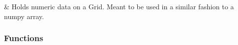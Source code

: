 \documentclass[letterpaper,10pt,english]{sphinxmanual}
\begin{document}
\begin{savenotes}\sphinxatlongtablestart\begin{longtable}[c]{}
\hline

\endfirsthead

%
{}\\
\hline

\endhead

\hline
{}\\
\endfoot

\endlastfoot

\sphinxAtStartPar
{\hyperref[\detokenize{autoapi/Field/index:Field.Field}]{}}
&
\sphinxAtStartPar
Holds numeric data on a Grid. Meant to be used in a similar fashion to a numpy array.
\\
\hline
\end{longtable}\sphinxatlongtableend\end{savenotes}


\subsubsection{Functions}
\label{\detokenize{autoapi/Field/index:functions}}
\end{document}
